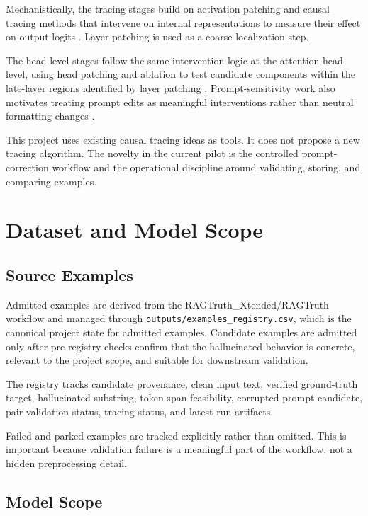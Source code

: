 \documentclass[11pt]{article}
\begin{document}
Mechanistically, the tracing stages build on activation patching and causal tracing methods that intervene on internal representations to measure their effect on output logits \citep{ROME,ActivationPatchingBestPractices}. Layer patching is used as a coarse localization step.

The head-level stages follow the same intervention logic at the attention-head level, using head patching and ablation to test candidate components within the late-layer regions identified by layer patching \citep{TransformerCircuits,IOICircuit}. Prompt-sensitivity work also motivates treating prompt edits as meaningful interventions rather than neutral formatting changes \citep{AutoPrompt,PromptOrderSensitivity}.

This project uses existing causal tracing ideas as tools. It does not propose a new tracing algorithm. The novelty in the current pilot is the controlled prompt-correction workflow and the operational discipline around validating, storing, and comparing examples.

\section{Dataset and Model Scope}

\subsection{Source Examples}

Admitted examples are derived from the RAGTruth\_Xtended/RAGTruth workflow and managed through \texttt{outputs/examples\_registry.csv}, which is the canonical project state for admitted examples. Candidate examples are admitted only after pre-registry checks confirm that the hallucinated behavior is concrete, relevant to the project scope, and suitable for downstream validation.

The registry tracks candidate provenance, clean input text, verified ground-truth target, hallucinated substring, token-span feasibility, corrupted prompt candidate, pair-validation status, tracing status, and latest run artifacts.

Failed and parked examples are tracked explicitly rather than omitted. This is important because validation failure is a meaningful part of the workflow, not a hidden preprocessing detail.

\subsection{Model Scope}
\end{document}
